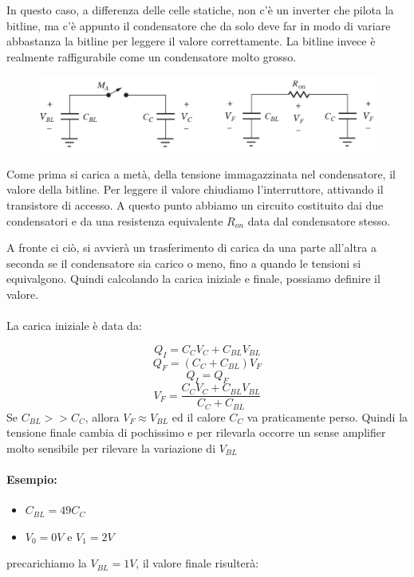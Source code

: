 In questo caso, a differenza delle celle statiche, non c'è un inverter che pilota la bitline, ma c'è appunto il condensatore che da solo deve far in modo di variare abbastanza la bitline per leggere il valore correttamente. La bitline invece è realmente raffigurabile come un condensatore molto grosso.


\begin{figure}[htbp]
    \centering
    \includegraphics[width=0.65\linewidth]{img/cella_rammona.png}
\end{figure}

\newpage
Come prima si carica a metà, della tensione immagazzinata nel condensatore, il valore della bitline. Per leggere il valore chiudiamo l'interruttore, attivando il transistore di accesso. A questo punto abbiamo un circuito costituito dai due condensatori e da una resistenza equivalente $R_{on}$ data dal condensatore stesso.  

A fronte ci ciò, si avvierà un trasferimento di carica da una parte all'altra a seconda se il condensatore sia carico o meno, fino a quando le tensioni si equivalgono. Quindi calcolando la carica iniziale e finale, possiamo definire il valore.

\paragraph{}
La carica iniziale è data da:

\begin{equation*}
    Q_I = C_CV_C + C_{BL}V_{BL}
\end{equation*}
\begin{equation*}
    Q_F = (C_C + C_{BL})V_{F}
\end{equation*}
\begin{equation*}
    Q_I = Q_F
\end{equation*}
\begin{equation*}
    V_F = \frac{ C_CV_C + C_{BL}V_{BL}}{C_C + C_{BL}}
\end{equation*}
Se $C_{BL} >> C_C$, allora $V_F \approx	V_{BL}$ ed il calore $C_C$ va praticamente perso. Quindi la tensione finale cambia di pochissimo e per rilevarla occorre un sense amplifier molto sensibile per rilevare la variazione di $V_{BL}$


\paragraph{Esempio:}
 \begin{itemize}
     \item[] $C_{BL} = 49 C_C$
     \item[] $ V_0 = 0V$ e $V_1 = 2V$
 \end{itemize}
precarichiamo la $V_{BL} = 1V$, il valore finale risulterà:

